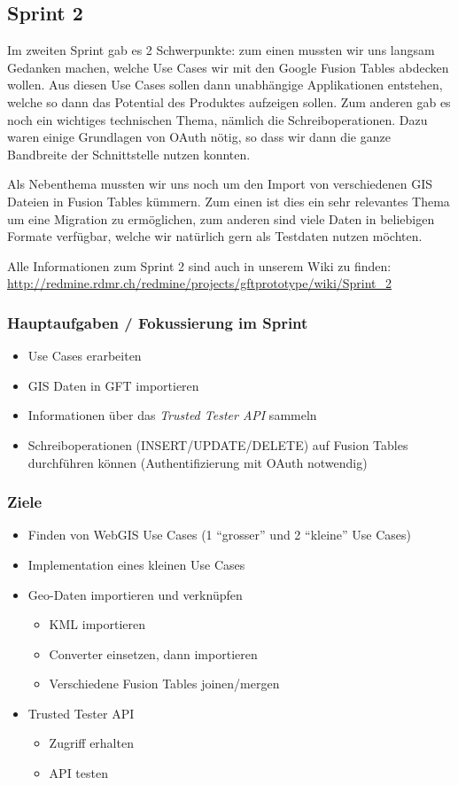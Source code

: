 \subsection{Sprint 2}

Im zweiten Sprint gab es 2 Schwerpunkte: zum einen mussten wir uns langsam Gedanken machen, welche Use Cases wir mit den Google Fusion Tables abdecken wollen. Aus diesen Use Cases sollen dann unabhängige Applikationen entstehen, welche so dann das Potential des Produktes aufzeigen sollen. Zum anderen gab es noch ein wichtiges technischen Thema, nämlich die Schreiboperationen. Dazu waren einige Grundlagen von OAuth nötig, so dass wir dann die ganze Bandbreite der Schnittstelle nutzen konnten.

Als Nebenthema mussten wir uns noch um den Import von verschiedenen GIS Dateien in Fusion Tables kümmern. Zum einen ist dies ein sehr relevantes Thema um eine Migration zu ermöglichen, zum anderen sind viele Daten in beliebigen Formate verfügbar, welche wir natürlich gern als Testdaten nutzen möchten.

Alle Informationen zum Sprint 2 sind auch in unserem Wiki zu finden:
\url{http://redmine.rdmr.ch/redmine/projects/gftprototype/wiki/Sprint_2}

\subsubsection{Hauptaufgaben / Fokussierung im Sprint}
\begin{itemize}
	\item Use Cases erarbeiten
	\item GIS Daten in GFT importieren
	\item Informationen über das \emph{Trusted Tester API} sammeln
	\item Schreiboperationen (INSERT/UPDATE/DELETE) auf Fusion Tables durchführen können (Authentifizierung mit OAuth notwendig)
\end{itemize}

\subsubsection{Ziele}
\begin{itemize}
	\item Finden von WebGIS Use Cases (1 "`grosser"' und 2 "`kleine"' Use Cases)
	\item Implementation eines kleinen Use Cases
	\item Geo-Daten importieren und verknüpfen
	\begin{itemize}
		\item KML importieren
		\item Converter einsetzen, dann importieren
		\item Verschiedene Fusion Tables joinen/mergen
	\end{itemize}
	\item Trusted Tester API
	\begin{itemize}
		\item Zugriff erhalten
		\item API testen
	\end{itemize}
\end{itemize}

